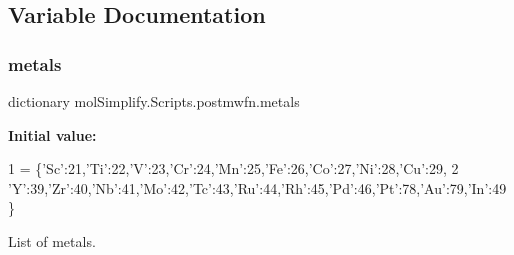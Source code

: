 \subsection{Variable Documentation}
\mbox{\label{namespacemolSimplify_1_1Scripts_1_1postmwfn_a9a96407d6ceb115d681da0f03f378b61}} 
\subsubsection{\texorpdfstring{metals}{metals}}
{\footnotesize\ttfamily dictionary mol\+Simplify.\+Scripts.\+postmwfn.\+metals}

{\bfseries Initial value\+:}
\begin{DoxyCode}
1 =  \{\textcolor{stringliteral}{'Sc'}:21,\textcolor{stringliteral}{'Ti'}:22,\textcolor{stringliteral}{'V'}:23,\textcolor{stringliteral}{'Cr'}:24,\textcolor{stringliteral}{'Mn'}:25,\textcolor{stringliteral}{'Fe'}:26,\textcolor{stringliteral}{'Co'}:27,\textcolor{stringliteral}{'Ni'}:28,\textcolor{stringliteral}{'Cu'}:29,
2           \textcolor{stringliteral}{'Y'}:39,\textcolor{stringliteral}{'Zr'}:40,\textcolor{stringliteral}{'Nb'}:41,\textcolor{stringliteral}{'Mo'}:42,\textcolor{stringliteral}{'Tc'}:43,\textcolor{stringliteral}{'Ru'}:44,\textcolor{stringliteral}{'Rh'}:45,\textcolor{stringliteral}{'Pd'}:46,\textcolor{stringliteral}{'Pt'}:78,\textcolor{stringliteral}{'Au'}:79,\textcolor{stringliteral}{'In'}:49\}
\end{DoxyCode}


List of metals. 

